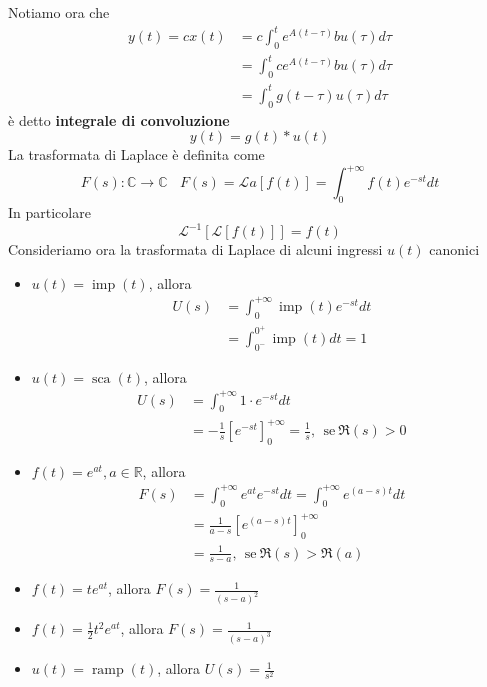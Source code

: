 \documentclass[10pt,a4paper]{book}
\DeclareMathOperator{\imp}{imp}
\DeclareMathOperator{\sca}{sca}
\DeclareMathOperator{\ramp}{ramp}
\begin{document}
Notiamo ora che
\begin{equation*}
	\begin{aligned}
		y(t) =cx(t) & =c\int ^t_0 e^{A(t-\tau)} bu(\tau) d\tau         \\
		            & =\int ^t_0\boxed{ce^{A(t-\tau)} b} u(\tau) d\tau \\
		            & =\int ^t_0\boxed{g(t-\tau)} u(\tau) d\tau        
	\end{aligned}
\end{equation*}
è detto \textbf{integrale di convoluzione}
\begin{equation}
	y(t) =g(t) *u(t)
\end{equation}
La trasformata di Laplace è definita come
\begin{equation}
	F(s) :\mathbb{C}\rightarrow \mathbb{C} \ \ \ \ F(s) =\mathcal{L} a[ f(t)] =\int ^{+\infty }_0 f(t) e^{-st} dt
\end{equation}
In particolare
\begin{equation*}
	\mathcal{L}^{-1}[\mathcal{L}[ f(t)]] =f(t)
\end{equation*}
Consideriamo ora la trasformata di Laplace di alcuni ingressi $u(t)$ canonici
\begin{itemize}
	\item $u(t) =\imp(t)$, allora\begin{equation*}
	      \begin{aligned}
	      	U(s) & =\int ^{+\infty }_0\imp(t) e^{-st} dt \\
	      	     & =\int ^{0^{+}}_{0^{-}}\imp(t) dt=1    
	      \end{aligned}
	\end{equation*}
	\item $u(t) =\sca(t)$, allora\begin{equation*}
	      \begin{aligned}
	      	U(s) & =\int ^{+\infty }_0 1\cdotp e^{-st} dt                                                   \\
	      	     & =-\frac{1}{s}\left[ e^{-st}\right]^{+\infty }_0 =\frac{1}{s} ,\ \ \text{se} \ \Re(s)  >0 
	      \end{aligned}
	\end{equation*}
	\item $f(t) =e^{at} ,a\in \mathbb{R}$, allora\begin{equation*}
	      \begin{aligned}
	      	F(s) & =\int ^{+\infty }_0 e^{at} e^{-st} dt=\int ^{+\infty }_0 e^{(a-s) t} dt \\
	      	     & =\frac{1}{a-s}\left[ e^{(a-s) t}\right]^{+\infty }_0                    \\
	      	     & =\frac{1}{s-a} ,\ \ \text{se} \ \Re(s)  >\Re(a)                         
	      \end{aligned}
	\end{equation*}
	\item $f(t) =te^{at}$, allora $F(s) =\frac{1}{(s-a)^2}$
	\item $f(t) =\frac{1}{2} t^2 e^{at}$, allora $F(s) =\frac{1}{(s-a)^3}$
	\item $u(t) =\ramp(t)$, allora $U(s) =\frac{1}{s^2}$
\end{itemize}
\end{document}
